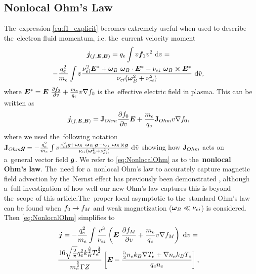\subsection{Nonlocal Ohm's Law}
\label{sec:Efield}
The~expression \eqref{eq:f1_explicit} becomes extremely useful when used
to describe the~electron fluid momentum, i.e. the~current velocity moment
\begin{multline}
  \vect{j}_{(f, \E, \B)} = \qe \int \vmag \fone \vmag^2~\dI \vmag = \\
  - \frac{\qe^2}{\me} \int \vmag \frac{\nuei^2 \E^* 
  + \omegaB~\omegaB\cdot\E^* - \nuei~\omegaB \vect{\times} \E^*}
  {\nuei (\omegaB^2 + \nuei^2)}~\dI \tilde{\vmag} ,
  \nonumber %
\end{multline}
where $\boldsymbol{E}^* = \boldsymbol{E}~\frac{\partial{f_0}}{\partial{v}} + \frac{m_e}{q_e}v \nabla f_0$ 
is the~effective electric field in plasma. 
This can be written as
\begin{equation}
  \boldsymbol{j}_{(f, \boldsymbol{E}, \boldsymbol{B})} = \mathbf{J}_{Ohm}\frac{\partial{f_0}}{\partial{v}}\boldsymbol{E} 
  + \frac{m_e}{q_e} \mathbf{J}_{Ohm}v \nabla f_0
  ,
  \label{eq:NonlocalOhm}
\end{equation}
where we used the~following notation 
$\mathbf{J}_{Ohm}\boldsymbol{g} = - \frac{q_e^2}{m_e} \int v \frac{\nu_{ei}^2 \boldsymbol{g} 
  + \boldsymbol{\omega}_{B}~\boldsymbol{\omega}_{B}\cdot\boldsymbol{g} - \nu_{ei}~\boldsymbol{\omega}_{B} \boldsymbol{\times} \boldsymbol{g}}
  {\nu_{ei} (\boldsymbol{\omega}_{B}^2 + \nu_{ei}^2)}~\text{d} \tilde{v}$ showing how $\mathbf{J}_{Ohm}$
acts on a~general vector field $\boldsymbol{g}$.
We refer to 
\eqref{eq:NonlocalOhm} as to the~{\bf nonlocal Ohm's law}.
The~need for a~nonlocal Ohm's law to accurately capture magnetic field 
advection by the~Nernst effect has previously been demonstrated 
\cite{Luciani85, Ridgers08, Brodrick18}, although a~full investigation 
of how well our new Ohm's law captures this is beyond the~scope of this article.The~proper local asymptotic to the~standard Ohm's law  
can be found when $f_0\rightarrow f_M$ and weak magnetization 
($\boldsymbol{\omega}_{B} \ll \nu_{ei}$) is considered. Then \eqref{eq:NonlocalOhm} simplifies to
\begin{multline}
  \boldsymbol{j} =- \frac{q_e^2}{m_e} \int \frac{v^3}{\nu_{ei}}
  \left( \boldsymbol{E}~\frac{\partial{f_M}}{\partial{v}} + \frac{m_e}{q_e}v \nabla f_M \right)
  ~\text{d} v =\\
  \frac{16\sqrt{\frac{2}{\pi}}q_e^2 k_B^\frac{3}{2} T_e^\frac{3}{2}}{m_e^\frac{5}{2} \Gamma Z}
  \left[\boldsymbol{E} - \frac{\frac{5}{2} n_e k_B \nabla T_e 
  + \nabla n_e k_B T_e}{q_e n_e}  \right] 
  ,
  \label{eq:AsymptoticOhm}
\end{multline}
